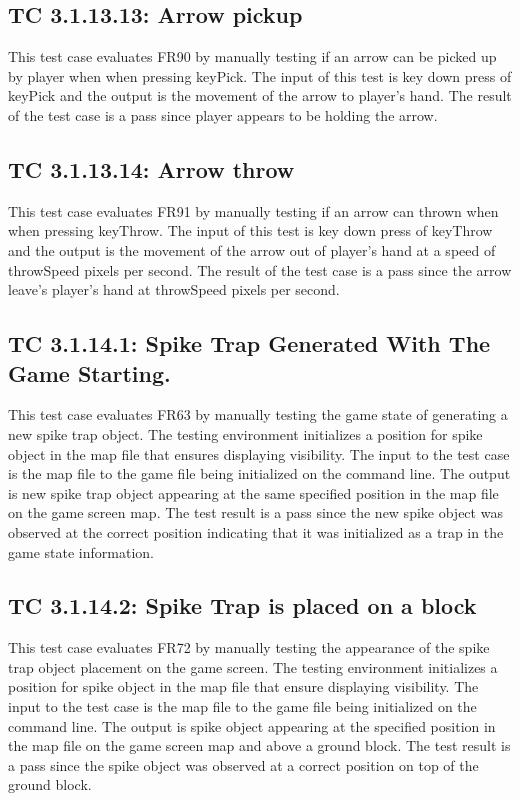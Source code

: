 \documentclass[12pt, titlepage]{article}
\begin{document}
\subsection*{TC 3.1.13.13: Arrow pickup}

This test case evaluates FR90 by manually testing if an arrow can be picked up by player when when pressing keyPick. The input of this test is key down press of keyPick and the output is the movement of the arrow to player's hand. The result of the test case is a pass since player appears to be holding the arrow.

\subsection*{TC 3.1.13.14: Arrow throw}

This test case evaluates FR91 by manually testing if an arrow can thrown when when pressing keyThrow. The input of this test is key down press of keyThrow and the output is the movement of the arrow out of player's hand at a speed of throwSpeed pixels per second. The result of the test case is a pass since the arrow leave's player's hand at throwSpeed pixels per second.

\subsection*{TC 3.1.14.1: Spike Trap Generated With The Game Starting.}
This test case evaluates FR63 by manually testing the game state of generating a new spike trap object. The testing environment initializes a position for spike object in the map file that ensures displaying visibility. The input to the test case is the map file to the game file being initialized on the command line. The output is new spike trap object appearing at the same specified position in the map file on the game screen map. The test result is a pass since the new spike object was observed at the correct position indicating that it was initialized as a trap in the game state information. 

\subsection*{TC 3.1.14.2: Spike Trap is placed on a block}
This test case evaluates FR72 by manually testing the appearance of the spike trap object placement on the game screen. The testing environment initializes a position for spike object in the map file that ensure displaying visibility. The input to the test case is the map file to the game file being initialized on the command line. The output is spike object appearing at the specified position in the map file on the game screen map and above a ground block. The test result is a pass since the spike object was observed at a correct position on top of the ground block. 
\end{document}
